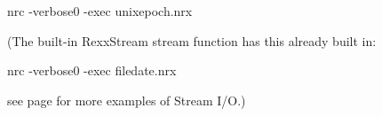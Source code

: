 

\begin{shaded}
\bash[stdout]
nrc -verbose0 -exec unixepoch.nrx
\END
\end{shaded}

(The built-in RexxStream stream function has this already built in:



\begin{shaded}
\bash[stdout]
nrc -verbose0 -exec filedate.nrx
\END
\end{shaded}

see page \pageref{refstreamio} for more examples of \nr{} Stream I/O.)